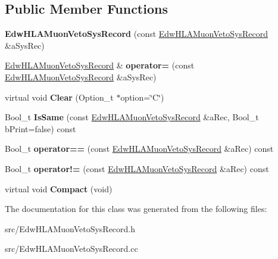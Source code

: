 \subsection*{Public Member Functions}
\begin{DoxyCompactItemize}
\item 
\hypertarget{class_edw_h_l_a_muon_veto_sys_record_a5ccde0bf7cf24c61e699f4c9df9468b3}{
{\bfseries EdwHLAMuonVetoSysRecord} (const \hyperlink{class_edw_h_l_a_muon_veto_sys_record}{EdwHLAMuonVetoSysRecord} \&aSysRec)}
\label{class_edw_h_l_a_muon_veto_sys_record_a5ccde0bf7cf24c61e699f4c9df9468b3}

\item 
\hypertarget{class_edw_h_l_a_muon_veto_sys_record_adbeeb7848cfe2ae40f4866c5bcdef0dd}{
\hyperlink{class_edw_h_l_a_muon_veto_sys_record}{EdwHLAMuonVetoSysRecord} \& {\bfseries operator=} (const \hyperlink{class_edw_h_l_a_muon_veto_sys_record}{EdwHLAMuonVetoSysRecord} \&aSysRec)}
\label{class_edw_h_l_a_muon_veto_sys_record_adbeeb7848cfe2ae40f4866c5bcdef0dd}

\item 
\hypertarget{class_edw_h_l_a_muon_veto_sys_record_a40d0c2f642f5b015c0eeda3e2962d941}{
virtual void {\bfseries Clear} (Option\_\-t $\ast$option=\char`\"{}C\char`\"{})}
\label{class_edw_h_l_a_muon_veto_sys_record_a40d0c2f642f5b015c0eeda3e2962d941}

\item 
\hypertarget{class_edw_h_l_a_muon_veto_sys_record_ae2a24525a013654000680f67ae141bcb}{
Bool\_\-t {\bfseries IsSame} (const \hyperlink{class_edw_h_l_a_muon_veto_sys_record}{EdwHLAMuonVetoSysRecord} \&aRec, Bool\_\-t bPrint=false) const }
\label{class_edw_h_l_a_muon_veto_sys_record_ae2a24525a013654000680f67ae141bcb}

\item 
\hypertarget{class_edw_h_l_a_muon_veto_sys_record_a87739e85f7b64ed5038dc362310aa9ba}{
Bool\_\-t {\bfseries operator==} (const \hyperlink{class_edw_h_l_a_muon_veto_sys_record}{EdwHLAMuonVetoSysRecord} \&aRec) const }
\label{class_edw_h_l_a_muon_veto_sys_record_a87739e85f7b64ed5038dc362310aa9ba}

\item 
\hypertarget{class_edw_h_l_a_muon_veto_sys_record_af7c90280d3e2ce64394ea25604373dad}{
Bool\_\-t {\bfseries operator!=} (const \hyperlink{class_edw_h_l_a_muon_veto_sys_record}{EdwHLAMuonVetoSysRecord} \&aRec) const }
\label{class_edw_h_l_a_muon_veto_sys_record_af7c90280d3e2ce64394ea25604373dad}

\item 
\hypertarget{class_edw_h_l_a_muon_veto_sys_record_a17d3f56287687a0752e7597f6fe4ed63}{
virtual void {\bfseries Compact} (void)}
\label{class_edw_h_l_a_muon_veto_sys_record_a17d3f56287687a0752e7597f6fe4ed63}

\end{DoxyCompactItemize}


The documentation for this class was generated from the following files:\begin{DoxyCompactItemize}
\item 
src/EdwHLAMuonVetoSysRecord.h\item 
src/EdwHLAMuonVetoSysRecord.cc\end{DoxyCompactItemize}
